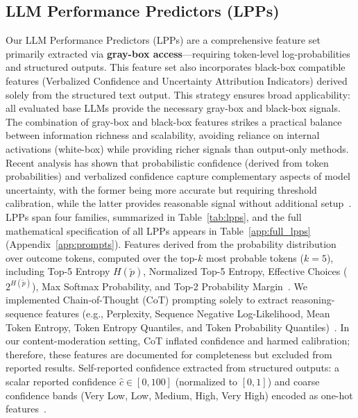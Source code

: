 \subsection{LLM Performance Predictors (LPPs)}
\label{subsec:lpps}
Our LLM Performance Predictors (LPPs) are a comprehensive feature set primarily extracted via \textbf{gray-box access}—requiring token-level log-probabilities and structured outputs. This feature set also incorporates black-box compatible features (Verbalized Confidence and Uncertainty Attribution Indicators) derived solely from the structured text output. This strategy ensures broad applicability: all evaluated base LLMs provide the necessary gray-box and black-box signals. The combination of gray-box and black-box features strikes a practical balance between information richness and scalability, avoiding reliance on internal activations (white-box) while providing richer signals than output-only methods. Recent analysis has shown that probabilistic confidence (derived from token probabilities) and verbalized confidence capture complementary aspects of model uncertainty, with the former being more accurate but requiring threshold calibration, while the latter provides reasonable signal without additional setup~\cite{ni+al:25}.
LPPs span four families, summarized in Table~\ref{tab:lpps}, and the full mathematical specification of all LPPs appears in Table~\ref{app:full_lpps} (Appendix~\ref{app:prompts}). 
Features derived from the probability distribution over outcome tokens, computed over the top-$k$ most probable tokens ($k=5$), including Top-5 Entropy $H(\tilde{p})$, Normalized Top-5 Entropy, Effective Choices ($2^{H(\tilde{p})}$), Max Softmax Probability, and Top-2
Probability Margin~\cite{kapoor2024large,kendall+al:17,farr+al:25,watson2023explaining,shorinwa2025surveyuncertaintyquantificationlarge, correa+al:25}.
We implemented Chain-of-Thought (CoT) prompting solely to extract reasoning-sequence features (e.g., Perplexity, Sequence Negative Log-Likelihood, Mean Token Entropy, Token Entropy Quantiles, and Token Probability Quantiles)~\cite{guerreiro-etal-2023-looking,efficient-and-effective,correa+al:25}. 
In our content-moderation setting, CoT inflated confidence and harmed calibration; therefore, these features are documented for completeness but excluded from reported results.
Self-reported confidence extracted from structured outputs: a scalar reported confidence $\hat{c} \in [0,100]$ (normalized to $[0,1]$) and coarse confidence bands (Very Low, Low, Medium, High, Very High) encoded as one-hot features~\cite{kadavath+al:22,tian+al:23,yang2024verbalizedconfidencescoresllms,shorinwa2025surveyuncertaintyquantificationlarge,ni+al:25,xiong+al:23}.
